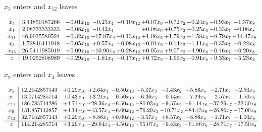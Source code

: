 \documentclass[9pt]{article}
\begin{document}
 $ x_{3} $ enters and $ x_{12} $ leaves 

 \[\begin{array}{c| c c@{\hskip 2pt} c@{\hskip 2pt} c@{\hskip 2pt} c@{\hskip 2pt} c@{\hskip 2pt} c@{\hskip 2pt} c@{\hskip 2pt} c@{\hskip 2pt} }
 x_{5}   &  3.44850187266 & +  0.01 x_{10} & -0.25 x_{4} & -0.10 x_{12} & +  0.07 x_{9} & -0.72 x_{2} & -0.24 x_{6} & -0.93 x_{7} & -1.37 x_{8}\\
 x_{1}   &  2.08333333333 & +  0.08 x_{10} & -0.42 x_{4} &   & +  0.08 x_{9} & +  0.75 x_{2} & -0.25 x_{6} & -0.33 x_{7} & -0.08 x_{8}\\
 x_{11}   &  46.9035580524 & +  0.32 x_{10} & -17.87 x_{4} & -0.13 x_{12} & +  1.06 x_{9} & +  1.79 x_{2} & -1.58 x_{6} & -8.79 x_{7} & -14.47 x_{8}\\
 x_{3}   &  1.72846441948 & +  0.05 x_{10} & +  0.57 x_{4} & -0.08 x_{12} & -0.01 x_{9} & -0.14 x_{2} & -1.11 x_{6} & -0.35 x_{7} & -0.22 x_{8}\\
 x_{13}   &  26.5411985019 & +  0.09 x_{10} & -10.90 x_{4} & +  0.28 x_{12} & +  0.05 x_{9} & +  9.07 x_{2} & -4.90 x_{6} & -0.46 x_{7} & -0.20 x_{8}\\
\hline
z    &  19.0252808989 & +  0.29 x_{10} & -1.81 x_{4} & -0.17 x_{12} & +  0.72 x_{9} & -1.69 x_{2} & -0.91 x_{6} & -9.33 x_{7} & -5.23 x_{8}\\
\end{array}\]


 $ x_{9} $ enters and $ x_{3} $ leaves 

 \[\begin{array}{c| c c@{\hskip 2pt} c@{\hskip 2pt} c@{\hskip 2pt} c@{\hskip 2pt} c@{\hskip 2pt} c@{\hskip 2pt} c@{\hskip 2pt} c@{\hskip 2pt} }
 x_{5}   &  12.2142857143 & +  0.29 x_{10} & +  2.64 x_{4} & -0.50 x_{12} & -5.07 x_{3} & -1.43 x_{2} & -5.86 x_{6} & -2.71 x_{7} & -2.50 x_{8}\\
 x_{1}   &  13.0714285714 & +  0.43 x_{10} & +  3.21 x_{4} & -0.50 x_{12} & -6.36 x_{3} & -0.14 x_{2} & -7.29 x_{6} & -2.57 x_{7} & -1.50 x_{8}\\
 x_{11}   &  186.785714286 & +  4.71 x_{10} & + 28.36 x_{4} & -6.50 x_{12} & -80.93 x_{3} & -9.57 x_{2} & -91.14 x_{6} & -37.29 x_{7} & -32.50 x_{8}\\
 x_{9}   &  131.857142857 & +  4.14 x_{10} & + 43.57 x_{4} & -6.00 x_{12} & -76.29 x_{3} & -10.71 x_{2} & -84.43 x_{6} & -26.86 x_{7} & -17.00 x_{8}\\
 x_{13}   &  32.7142857143 & +  0.29 x_{10} & -8.86 x_{4} & +  0.00 x_{12} & -3.57 x_{3} & +  8.57 x_{2} & -8.86 x_{6} & -1.71 x_{7} & -1.00 x_{8}\\
\hline
z    &  114.214285714 & +  3.29 x_{10} & + 29.64 x_{4} & -4.50 x_{12} & -55.07 x_{3} & -9.43 x_{2} & -61.86 x_{6} & -28.71 x_{7} & -17.50 x_{8}\\
\end{array}\]
\end{document}
